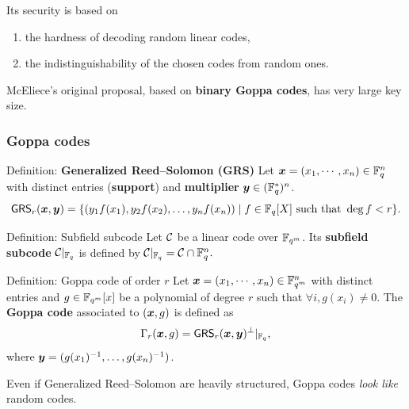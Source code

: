 \documentclass[
10pt, %
%
aspectratio=169, %
]{beamer}
\begin{document}
\begin{frame}
	\medskip
	
	\begin{minipage}{0.27\textwidth}
		Its security is based on 
		
		\vspace*{1.5em}
	\end{minipage}%
	\begin{minipage}{0.72\textwidth}
		\begin{enumerate}
		\item the hardness of decoding random linear codes,
		\item the indistinguishability of the chosen codes from random ones.
	\end{enumerate}
	\end{minipage}
	
	

	\bigskip
	
	McEliece's original proposal, based on \textbf{binary Goppa codes}, has \textcolor{bred}{very large key size}.
	
\end{frame}%
		
		
		
	


\begin{frame}
	\frametitle{Goppa codes}
	
	
	\begin{block}{Definition: \textbf{Generalized Reed--Solomon (GRS)}}
		Let $\boldsymbol{x}=(x_1,\cdots,x_n) \in \mathbb{F}_q^n$  with distinct entries (\textbf{support}) and \textbf{multiplier} $\boldsymbol{y} \in (\mathbb{F}_q^*)^n$.
		\[\mathsf{GRS}_r(\boldsymbol{x},\boldsymbol{y})=\{(y_1f(x_1),y_2f(x_2),\dots,y_nf(x_n)) \mid f \in \mathbb{F}_q[X] \text{ such that } \deg f < r \}.\]
	\end{block}
	
	\begin{block}{Definition: Subfield subcode}
		Let $\mathcal{C}$ be a linear code over $\mathbb{F}_{q^m}$.
		Its \textbf{subfield subcode} $\mathcal{C}|_{\mathbb{F}_q}$ is defined by $\mathcal{C}|_{\mathbb{F}_q}=\mathcal{C} \cap \mathbb{F}_q^n.$
	\end{block}
	
\begin{block}{Definition: Goppa code of order $r$}
	Let $\boldsymbol{x}=(x_1,\cdots,x_n) \in \mathbb{F}_{q^m}^n$ with distinct entries and $g \in \mathbb{F}_{q^m} [x]$ be a polynomial of degree $r$ such that $\forall i, g(x_i)\neq 0$. The \textbf{Goppa code} associated to $(\boldsymbol{x}, g)$ is defined as \[\Gamma_r(\boldsymbol{x},g)= \mathsf{GRS}_r(\boldsymbol{x},\boldsymbol{y})^\perp|_{\mathbb{F}_q},\]
	where $\boldsymbol{y} = (g(x_1)^{-1},\dots,g(x_n)^{-1})$.
\end{block}



Even if Generalized Reed--Solomon are heavily structured, Goppa codes \textit{look like} random codes.



\end{frame}%
\end{document}
